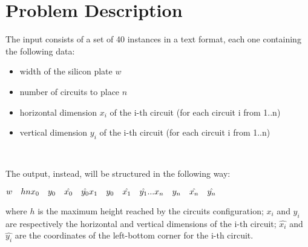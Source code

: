 \section{Problem Description}

The input consists of a set of 40 instances in a text format, each one containing the following data:

\begin{itemize}
    \item width of the silicon plate $w$
    \item number of circuits to place $n$
    \item horizontal dimension $x_i$ of the i-th circuit (for each circuit i from 1..n)
    \item vertical dimension $y_i$ of the i-th circuit (for each circuit i from 1..n)
\end{itemize}\

The output, instead, will be structured in the following way:

$ w \quad h \\
n \\
x_0\quad y_0\quad \hat{x_0}\quad \hat{y_0} \\
x_1\quad y_0\quad \hat{x_1}\quad \hat{y_1} \\
. . . \\
x_n\quad y_n\quad \hat{x_n}\quad \hat{y_n} \\
$

where $h$ is the maximum height reached by the circuits configuration; $x_i$ and $y_i$ are respectively the horizontal and vertical dimensions of the i-th circuit; $\hat{x_i}$ and $\hat{y_i}$ are the coordinates of the left-bottom corner for the i-th circuit.
